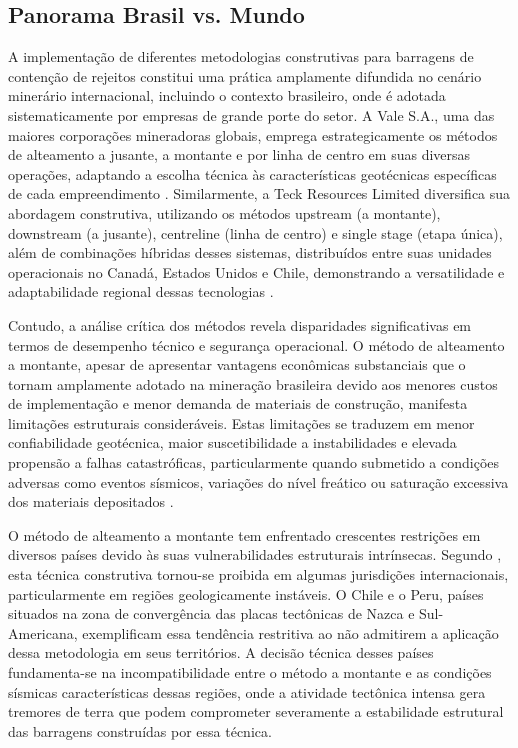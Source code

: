 \subsection{Panorama Brasil vs. Mundo}

A implementação de diferentes metodologias construtivas para barragens de contenção de rejeitos constitui uma prática amplamente difundida no cenário minerário internacional, incluindo o contexto brasileiro, onde é adotada sistematicamente por empresas de grande porte do setor. A Vale S.A., uma das maiores corporações mineradoras globais, emprega estrategicamente os métodos de alteamento a jusante, a montante e por linha de centro em suas diversas operações, adaptando a escolha técnica às características geotécnicas específicas de cada empreendimento \cite{vale2024}. Similarmente, a Teck Resources Limited diversifica sua abordagem construtiva, utilizando os métodos upstream (a montante), downstream (a jusante), centreline (linha de centro) e single stage (etapa única), além de combinações híbridas desses sistemas, distribuídos entre suas unidades operacionais no Canadá, Estados Unidos e Chile, demonstrando a versatilidade e adaptabilidade regional dessas tecnologias \cite{teck2019}.

Contudo, a análise crítica dos métodos revela disparidades significativas em termos de desempenho técnico e segurança operacional. O método de alteamento a montante, apesar de apresentar vantagens econômicas substanciais que o tornam amplamente adotado na mineração brasileira devido aos menores custos de implementação e menor demanda de materiais de construção, manifesta limitações estruturais consideráveis. Estas limitações se traduzem em menor confiabilidade geotécnica, maior suscetibilidade a instabilidades e elevada propensão a falhas catastróficas, particularmente quando submetido a condições adversas como eventos sísmicos, variações do nível freático ou saturação excessiva dos materiais depositados \cite{cardozo2017}.

O método de alteamento a montante tem enfrentado crescentes restrições em diversos países devido às suas vulnerabilidades estruturais intrínsecas. Segundo \cite{thome2018}, esta técnica construtiva tornou-se proibida em algumas jurisdições internacionais, particularmente em regiões geologicamente instáveis. O Chile e o Peru, países situados na zona de convergência das placas tectônicas de Nazca e Sul-Americana, exemplificam essa tendência restritiva ao não admitirem a aplicação dessa metodologia em seus territórios. A decisão técnica desses países fundamenta-se na incompatibilidade entre o método a montante e as condições sísmicas características dessas regiões, onde a atividade tectônica intensa gera tremores de terra que podem comprometer severamente a estabilidade estrutural das barragens construídas por essa técnica.

